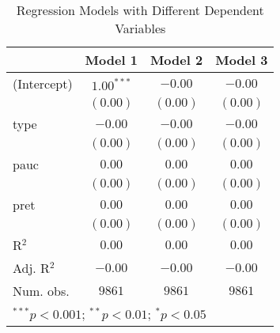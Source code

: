 
\begin{table}
\begin{center}
\begin{tabular}{l c c c}
\hline
 & Model 1 & Model 2 & Model 3 \\
\hline
(Intercept) & $1.00^{***}$ & $-0.00$  & $-0.00$  \\
            & $(0.00)$     & $(0.00)$ & $(0.00)$ \\
type        & $-0.00$      & $-0.00$  & $-0.00$  \\
            & $(0.00)$     & $(0.00)$ & $(0.00)$ \\
pauc        & $0.00$       & $0.00$   & $0.00$   \\
            & $(0.00)$     & $(0.00)$ & $(0.00)$ \\
pret        & $0.00$       & $0.00$   & $0.00$   \\
            & $(0.00)$     & $(0.00)$ & $(0.00)$ \\
\hline
R$^2$       & $0.00$       & $0.00$   & $0.00$   \\
Adj. R$^2$  & $-0.00$      & $-0.00$  & $-0.00$  \\
Num. obs.   & $9861$       & $9861$   & $9861$   \\
\hline
\multicolumn{4}{l}{\scriptsize{$^{***}p<0.001$; $^{**}p<0.01$; $^{*}p<0.05$}}
\end{tabular}
\caption{Regression Models with Different Dependent Variables}
\label{tab:reg_by_dep_var}
\end{center}
\end{table}
